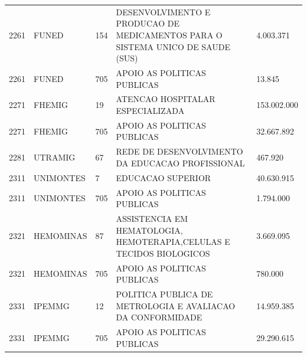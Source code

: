 \documentclass{article}
\begin{document}
\begin{longtable}[c]{m{1cm}|m{1.5cm}|m{1cm}m{10cm}|m{2cm}}
\multicolumn{1}{C{1cm}|}{2261} & \multicolumn{1}{L{1.5cm}|}{FUNED} & \multicolumn{1}{C{1cm}|}{154} & \multicolumn{1}{L{10cm}|}{DESENVOLVIMENTO E PRODUCAO DE MEDICAMENTOS PARA O SISTEMA UNICO DE SAUDE (SUS)} & \multicolumn{1}{R{2cm}}{4.003.371} \\
\multicolumn{1}{C{1cm}|}{2261} & \multicolumn{1}{L{1.5cm}|}{FUNED} & \multicolumn{1}{C{1cm}|}{705} & \multicolumn{1}{L{10cm}|}{APOIO AS POLITICAS PUBLICAS} & \multicolumn{1}{R{2cm}}{13.845} \\
\multicolumn{1}{C{1cm}|}{2271} & \multicolumn{1}{L{1.5cm}|}{FHEMIG} & \multicolumn{1}{C{1cm}|}{19} & \multicolumn{1}{L{10cm}|}{ATENCAO HOSPITALAR ESPECIALIZADA} & \multicolumn{1}{R{2cm}}{153.002.000} \\
\multicolumn{1}{C{1cm}|}{2271} & \multicolumn{1}{L{1.5cm}|}{FHEMIG} & \multicolumn{1}{C{1cm}|}{705} & \multicolumn{1}{L{10cm}|}{APOIO AS POLITICAS PUBLICAS} & \multicolumn{1}{R{2cm}}{32.667.892} \\
\multicolumn{1}{C{1cm}|}{2281} & \multicolumn{1}{L{1.5cm}|}{UTRAMIG} & \multicolumn{1}{C{1cm}|}{67} & \multicolumn{1}{L{10cm}|}{REDE DE DESENVOLVIMENTO DA EDUCACAO PROFISSIONAL} & \multicolumn{1}{R{2cm}}{467.920} \\
\multicolumn{1}{C{1cm}|}{2311} & \multicolumn{1}{L{1.5cm}|}{UNIMONTES} & \multicolumn{1}{C{1cm}|}{7} & \multicolumn{1}{L{10cm}|}{EDUCACAO SUPERIOR} & \multicolumn{1}{R{2cm}}{40.630.915} \\
\multicolumn{1}{C{1cm}|}{2311} & \multicolumn{1}{L{1.5cm}|}{UNIMONTES} & \multicolumn{1}{C{1cm}|}{705} & \multicolumn{1}{L{10cm}|}{APOIO AS POLITICAS PUBLICAS} & \multicolumn{1}{R{2cm}}{1.794.000} \\
\multicolumn{1}{C{1cm}|}{2321} & \multicolumn{1}{L{1.5cm}|}{HEMOMINAS} & \multicolumn{1}{C{1cm}|}{87} & \multicolumn{1}{L{10cm}|}{ASSISTENCIA EM HEMATOLOGIA, HEMOTERAPIA,CELULAS E TECIDOS BIOLOGICOS} & \multicolumn{1}{R{2cm}}{3.669.095} \\
\multicolumn{1}{C{1cm}|}{2321} & \multicolumn{1}{L{1.5cm}|}{HEMOMINAS} & \multicolumn{1}{C{1cm}|}{705} & \multicolumn{1}{L{10cm}|}{APOIO AS POLITICAS PUBLICAS} & \multicolumn{1}{R{2cm}}{780.000} \\
\multicolumn{1}{C{1cm}|}{2331} & \multicolumn{1}{L{1.5cm}|}{IPEMMG} & \multicolumn{1}{C{1cm}|}{12} & \multicolumn{1}{L{10cm}|}{POLITICA PUBLICA DE METROLOGIA E AVALIACAO DA CONFORMIDADE} & \multicolumn{1}{R{2cm}}{14.959.385} \\
\multicolumn{1}{C{1cm}|}{2331} & \multicolumn{1}{L{1.5cm}|}{IPEMMG} & \multicolumn{1}{C{1cm}|}{705} & \multicolumn{1}{L{10cm}|}{APOIO AS POLITICAS PUBLICAS} & \multicolumn{1}{R{2cm}}{29.290.615} \\

\end{longtable}
\end{document}
